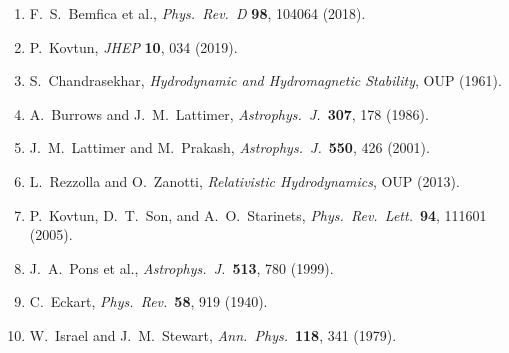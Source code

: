 \begin{enumerate}
\item F.~S.~Bemfica et al., \textit{Phys.\ Rev.\ D} \textbf{98}, 104064 (2018).
\item P.~Kovtun, \textit{JHEP} \textbf{10}, 034 (2019).
\item S.~Chandrasekhar, \textit{Hydrodynamic and Hydromagnetic Stability}, OUP (1961).
\item A.~Burrows and J.~M.~Lattimer, \textit{Astrophys.\ J.}\ \textbf{307}, 178 (1986).
\item J.~M.~Lattimer and M.~Prakash, \textit{Astrophys.\ J.}\ \textbf{550}, 426 (2001).
\item L.~Rezzolla and O.~Zanotti, \textit{Relativistic Hydrodynamics}, OUP (2013).
\item P.~Kovtun, D.~T.~Son, and A.~O.~Starinets, \textit{Phys.\ Rev.\ Lett.}\ \textbf{94}, 111601 (2005).
\item J.~A.~Pons et al., \textit{Astrophys.\ J.}\ \textbf{513}, 780 (1999).
\item C.~Eckart, \textit{Phys.\ Rev.}\ \textbf{58}, 919 (1940).
\item W.~Israel and J.~M.~Stewart, \textit{Ann.\ Phys.}\ \textbf{118}, 341 (1979).
\end{enumerate}
